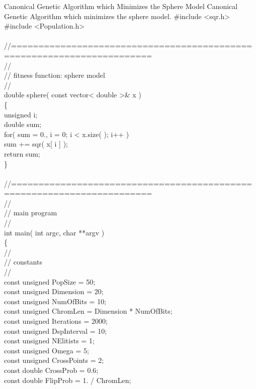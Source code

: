 \begin{programlisting}{Canonical Genetic Algorithm which Minimizes the Sphere Model}{
    Canonical Genetic Algorithm which minimizes the sphere model.}
#include <sqr.h>\\
#include <Population.h>\\
\\
//=======================================================================\\
//\\
// fitness function: sphere model\\
//\\
double sphere( const vector< double >& x )\\
\{\\
    unsigned i;\\
    double   sum;\\
    for( sum = 0., i = 0; i < x.size( ); i++ )\\
        sum += sqr( x[ i ] );\\
    return sum;\\
\}\\
\\
//=======================================================================\\
//\\
// main program\\
//\\
int main( int argc, char **argv )\\
\{\\
    //\\
    // constants\\
    //\\
    const unsigned PopSize     = 50;\\
    const unsigned Dimension   = 20;\\
    const unsigned NumOfBits   = 10;\\
    const unsigned ChromLen    = Dimension * NumOfBits;\\
    const unsigned Iterations  = 2000;\\
    const unsigned DspInterval = 10;\\
    const unsigned NElitists   = 1;\\
    const unsigned Omega       = 5;\\
    const unsigned CrossPoints = 2;\\
    const double   CrossProb   = 0.6;\\
    const double   FlipProb    = 1. / ChromLen;\\

\end{programlisting}
